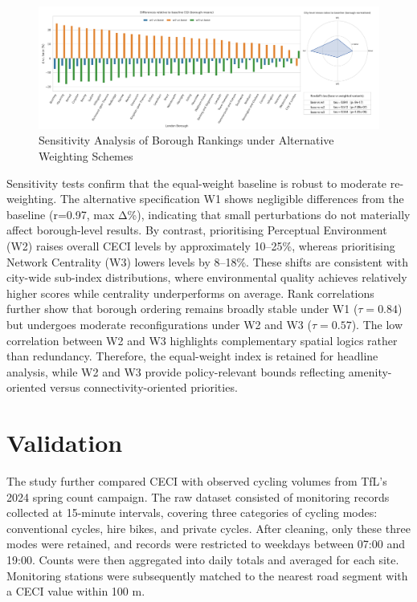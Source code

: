 \documentclass[
  12pt,
  oneside]{book}
\begin{document}
\begin{figure}

{\centering \includegraphics[width=1\linewidth]{general_images/cqi_robustness_delta_bar} 

}

\caption{Sensitivity Analysis of Borough Rankings under Alternative Weighting Schemes}\label{fig:cqirobustnessdeltabar}
\end{figure}

Sensitivity tests confirm that the equal-weight baseline is robust to moderate re-weighting. The alternative specification W1 shows negligible differences from the baseline (r=0.97, max \textbar Δ\%), indicating that small perturbations do not materially affect borough-level results. By contrast, prioritising Perceptual Environment (W2) raises overall CECI levels by approximately 10--25\%, whereas prioritising Network Centrality (W3) lowers levels by 8--18\%. These shifts are consistent with city-wide sub-index distributions, where environmental quality achieves relatively higher scores while centrality underperforms on average. Rank correlations further show that borough ordering remains broadly stable under W1 (\(\tau = 0.84\)) but undergoes moderate reconfigurations under W2 and W3 (\(\tau = 0.57\)). The low correlation between W2 and W3 highlights complementary spatial logics rather than redundancy. Therefore, the equal-weight index is retained for headline analysis, while W2 and W3 provide policy-relevant bounds reflecting amenity-oriented versus connectivity-oriented priorities.

\section{Validation}\label{validation}

The study further compared CECI with observed cycling volumes from TfL's 2024 spring count campaign. The raw dataset consisted of monitoring records collected at 15-minute intervals, covering three categories of cycling modes: conventional cycles, hire bikes, and private cycles. After cleaning, only these three modes were retained, and records were restricted to weekdays between 07:00 and 19:00. Counts were then aggregated into daily totals and averaged for each site. Monitoring stations were subsequently matched to the nearest road segment with a CECI value within 100 m.
\end{document}
